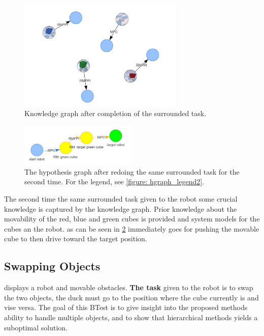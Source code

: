 \begin{figure}[H]
    \centering
    \includegraphics[width=0.7\textwidth]{figures/surrounded/surrounded_kgraph.png}
    \caption{Knowledge graph after completion of the surrounded task.}
    \label{figure:  surrounded_kgraph}
\end{figure}

\begin{figure}[H]
    \centering
    \includegraphics[width=0.5\textwidth]{figures/surrounded/thank_you_hgraph.png}
    \caption{The hypothesis graph after redoing the same surrounded task for the second time. For the legend, see \cref{figure: hgraph_legend2}.}
    \label{figure: surrounded_with_prior_knowledge}
\end{figure}

The second time the same surrounded task given to the robot some crucial knowledge is captured by the knowledge graph. Prior knowledge about the movability of the red, blue and green cubes is provided and system models for the cubes an the robot. as can be seen in \cref{figure: surrounded_with_prior_knowledge} immediately goes for pushing the movable cube to then drive toward the target position.

\subsection{Swapping Objects}
 displays a robot and movable obstacles. \textbf{The task} given to the robot is to swap the two objects, the duck must go to the position where the cube currently is and vise versa. The goal of this BTest is to give insight into the proposed methods ability to handle multiple objects, and to show that hierarchical methods yields a suboptimal solution. \\

